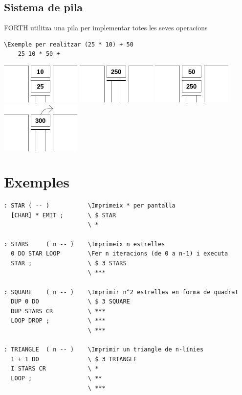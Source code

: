 \documentclass{beamer}
\begin{document}
\subsection{Sistema de pila}

\begin{frame}[fragile]
    FORTH utilitza una pila per implementar totes les seves operacions
    
    \begin{lstlisting}[frame=single]
    \Exemple per realitzar (25 * 10) + 50
    25 10 * 50 +
    \end{lstlisting}
    
    \centering
    \includegraphics[width=0.2\linewidth]{stack_1}
    \hfill
    \includegraphics[width=0.2\linewidth]{stack_2}
    \hfill
    \includegraphics[width=0.2\linewidth]{stack_3}
    \hfill
    \includegraphics[width=0.2\linewidth]{stack_4}
\end{frame}

\section{Exemples}

\begin{frame}[fragile]
    
    \begin{lstlisting}[frame=single, basicstyle=\tiny\ttfamily]
: STAR ( -- )           \Imprimeix * per pantalla          
  [CHAR] * EMIT ;       \ $ STAR
                        \ *

: STARS     ( n -- )    \Imprimeix n estrelles
  0 DO STAR LOOP        \Fer n iteracions (de 0 a n-1) i executa
  STAR ;                \ $ 3 STARS
                        \ ***
  
: SQUARE    ( n -- )    \Imprimir n^2 estrelles en forma de quadrat
  DUP 0 DO              \ $ 3 SQUARE
  DUP STARS CR          \ ***
  LOOP DROP ;           \ ***
                        \ ***
  
: TRIANGLE  ( n -- )    \Imprimir un triangle de n-línies
  1 + 1 DO              \ $ 3 TRIANGLE
  I STARS CR            \ *
  LOOP ;                \ **
                        \ ***
    \end{lstlisting}
\end{frame}
\end{document}
